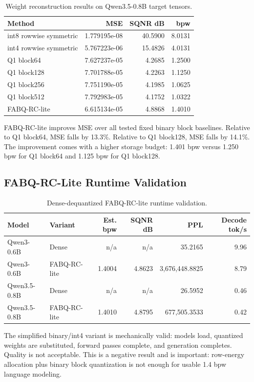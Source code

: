 \documentclass[11pt]{article}
\begin{document}
\begin{table}[h]
\centering
\begin{tabular}{lrrr}
\toprule
Method & MSE & SQNR dB & bpw \\
\midrule
int8 rowwise symmetric & 1.779195e-08 & 40.5900 & 8.0131 \\
int4 rowwise symmetric & 5.767223e-06 & 15.4826 & 4.0131 \\
Q1 block64 & 7.627237e-05 & 4.2685 & 1.2500 \\
Q1 block128 & 7.701788e-05 & 4.2263 & 1.1250 \\
Q1 block256 & 7.751190e-05 & 4.1985 & 1.0625 \\
Q1 block512 & 7.792983e-05 & 4.1752 & 1.0322 \\
FABQ-RC-lite & 6.615134e-05 & 4.8868 & 1.4010 \\
\bottomrule
\end{tabular}
\caption{Weight reconstruction results on Qwen3.5-0.8B target tensors.}
\label{tab:weight}
\end{table}

FABQ-RC-lite improves MSE over all tested fixed binary block baselines. Relative to Q1 block64, MSE falls by 13.3\%. Relative to Q1 block128, MSE falls by 14.1\%. The improvement comes with a higher storage budget: 1.401 bpw versus 1.250 bpw for Q1 block64 and 1.125 bpw for Q1 block128.

\subsection{FABQ-RC-Lite Runtime Validation}

\begin{table}[h]
\centering
\begin{tabular}{llrrrr}
\toprule
Model & Variant & Est. bpw & SQNR dB & PPL & Decode tok/s \\
\midrule
Qwen3-0.6B & Dense & n/a & n/a & 35.2165 & 9.96 \\
Qwen3-0.6B & FABQ-RC-lite & 1.4004 & 4.8623 & 3,676,448.8825 & 8.79 \\
Qwen3.5-0.8B & Dense & n/a & n/a & 26.5952 & 0.46 \\
Qwen3.5-0.8B & FABQ-RC-lite & 1.4010 & 4.8795 & 677,505.3533 & 0.42 \\
\bottomrule
\end{tabular}
\caption{Dense-dequantized FABQ-RC-lite runtime validation.}
\label{tab:fabq-lite}
\end{table}

The simplified binary/int4 variant is mechanically valid: models load, quantized weights are substituted, forward passes complete, and generation completes. Quality is not acceptable. This is a negative result and is important: row-energy allocation plus binary block quantization is not enough for usable 1.4 bpw language modeling.
\end{document}
